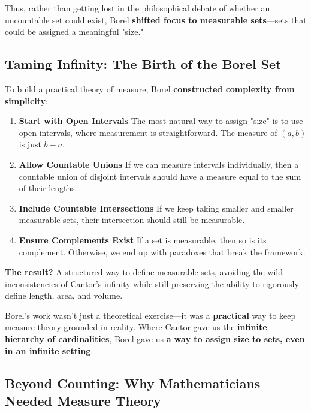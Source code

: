 Thus, rather than getting lost in the philosophical debate of whether an uncountable set could exist, Borel \textbf{shifted focus to measurable sets}—sets that could be assigned a meaningful "size."

\subsection{Taming Infinity: The Birth of the Borel Set}

To build a practical theory of measure, Borel \textbf{constructed complexity from simplicity}:

\begin{enumerate}
    \item \textbf{Start with Open Intervals}  
    The most natural way to assign "size" is to use open intervals, where measurement is straightforward. The measure of \( (a, b) \) is just \( b - a \).

    \item \textbf{Allow Countable Unions}  
    If we can measure intervals individually, then a countable union of disjoint intervals should have a measure equal to the sum of their lengths.

    \item \textbf{Include Countable Intersections}  
    If we keep taking smaller and smaller measurable sets, their intersection should still be measurable.

    \item \textbf{Ensure Complements Exist}  
    If a set is measurable, then so is its complement. Otherwise, we end up with paradoxes that break the framework.
\end{enumerate}

\textbf{The result?} A structured way to define measurable sets, avoiding the wild inconsistencies of Cantor’s infinity while still preserving the ability to rigorously define length, area, and volume.

Borel's work wasn’t just a theoretical exercise—it was a \textbf{practical} way to keep measure theory grounded in reality. Where Cantor gave us the \textbf{infinite hierarchy of cardinalities}, Borel gave us \textbf{a way to assign size to sets, even in an infinite setting}.

\subsection{Beyond Counting: Why Mathematicians Needed Measure Theory}

